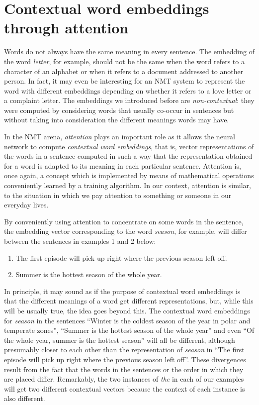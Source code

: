 \documentclass[output=paper,colorlinks,citecolor=brown]{langscibook}
\begin{document}
\section{Contextual word embeddings through attention} 

Words do not always have the same meaning in every sentence. The embedding of the word \emph{letter}, for example, should not be the same when the word refers to a character of an alphabet or when it refers to a document addressed to another person. In fact, it may even be interesting for an NMT system to represent the word with different embeddings depending on whether it refers to a love letter or a complaint letter. The embeddings we introduced before are \emph{non-contextual}: they were computed by considering words that usually co-occur in sentences but without taking into consideration the different meanings words may have.

In the NMT arena, \emph{attention} plays an important role as it allows the neural network to compute \emph{contextual word embeddings}, that is, vector representations of the words in a sentence computed in such a way that the representation obtained for a word is adapted to its meaning in each particular sentence. Attention is, once again, a concept which is implemented by means of mathematical operations conveniently learned by a training algorithm. In our context, attention is similar, to the situation in which we pay attention to something or someone in our everyday lives.

By conveniently using attention to concentrate on some words in the sentence, the embedding vector corresponding to the word \emph{season}, for example, will differ between the  sentences in examples 1 and 2 below:

\begin{enumerate}
  \item The first episode will pick up right where the previous season left off.
  \item Summer is the hottest season of the whole year.
\end{enumerate}

In principle, it may sound as if the purpose of contextual word embeddings is that the different meanings of a word get different representations, but, while this will be usually true, the idea goes beyond this. The contextual word embeddings for \emph{season} in the sentences ``Winter is the coldest season of the year in polar and temperate zones'', ``Summer is the hottest season of the whole year'' and even ``Of the whole year, summer is the hottest season'' will all be different, although presumably closer to each other than the representation of \emph{season} in ``The first episode will pick up right where the previous season left off''. These divergences result from the fact that the words in the sentences or the order in which they are placed differ. Remarkably, the two instances of \emph{the} in each of our examples will get two different contextual vectors because the context of each instance is also different.
\end{document}
